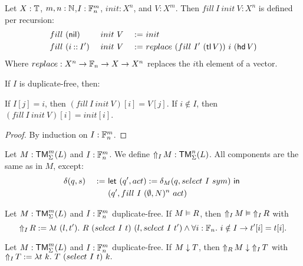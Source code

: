\begin{definition}
  Let $X:\Type$, $m,n:\Nat$,$I:\Fin_n^m$, $init:X^n$, and $V:X^m$.  Then $fill~I~init~V : X^n$ is defined per recursion:
  \begin{alignat*}{3}
    & fill~(\nil      )&& ~init~V &~:=~& init \\
    & fill~(i \cons I')&& ~init~V &~:=~& replace~(fill~I'~(\tl V))~i~(\hd V)
  \end{alignat*}
  Where $replace : X^n \to \Fin_n \to X \to X^n$ replaces the $i$th element of a vector.
\end{definition}
\begin{lemma}
  If $I$ is duplicate-free, then:
  \begin{enumerate}
   \label{lem:fill_correct_nth}
    If $I[j]=i$, then $(fill~I~init~V)[i] = V[j]$.
   \label{lem:fill_not_index}
    If $i \notin I$, then $(fill~I~init~V)[i] = init[i]$.
  \end{enumerate}
\end{lemma}
\begin{proof}
  By induction on $I : \Fin_n^m$.
\end{proof}

\begin{definition}[$\LiftTapes{M}{I}$][LiftTapes]
  \label{def:LiftTapes}
  Let $M:\TM_\Sigma^m(L)$ and $I : \Fin_n^m$.  We define $\LiftTapes{M}{I} : \TM_\Sigma^n(L)$.  All components are the same as in $M$, except:
  \begin{alignat*}{2}
    &\delta(q,s) &~:=~& \Let{(q', act) := \delta_M(q, select~I~sym)}{\\%
    &            &~  ~& (q', fill~I~(\None,N)^n~act)}
  \end{alignat*}
\end{definition}

\begin{lemma}
  \label{lem:LiftTapes_Realise}
  Let $M : \TM_\Sigma^m(L)$ and $I : \Fin_n^m$ duplicate-free.  If $M \Realise R$, then $\LiftTapes{M}{I} \Realise \LiftTapes{R}{I}$ with
  \[
    \LiftTapes{R}{I} := \lambda t~(l,t').~ R~(select~I~t)~(l, select~I~t') \land \forall i:\Fin_n.~i \notin I \rightarrow t'[i]=t[i].
  \]
\end{lemma}

\begin{lemma}
  \label{lem:LiftTapes_TerminatesIn}
  Let $M : \TM_\Sigma^m(L)$ and $I : \Fin_n^m$ duplicate-free. If $M \TerminatesIn T$, then $\LiftTapes{M}{R} \TerminatesIn \LiftTapes{T}{I}$ with
  $ \LiftTapes{T}{I} := \lambda t~k.~ T~(select~I~t)~k.  $
\end{lemma}

